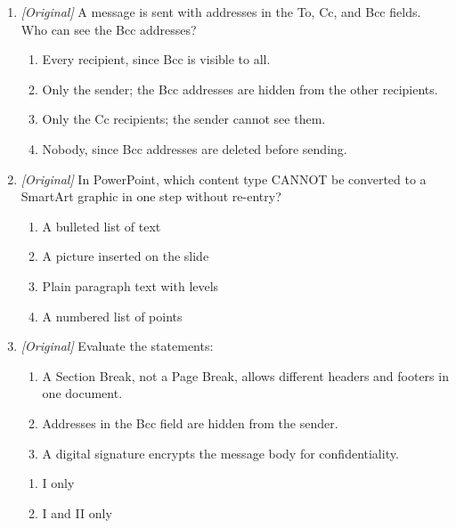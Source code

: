 \begin{enumerate}[label=\textbf{Q\arabic*.}, leftmargin=*]
\begin{enumerate}[label=\Alph*.]
    \item IMAP downloads mail and always deletes it from the server; POP3
      keeps devices synchronised.
    \item SMTP sends mail; POP3 downloads mail to the local device; IMAP keeps
      mail on the server and synchronises devices.
    \item POP3 keeps mail synced on the server across all devices.
  \end{enumerate}
\item \textit{[Original]} A message is sent with addresses in the To, Cc, and
  Bcc fields. Who can see the Bcc addresses?
  \begin{enumerate}[label=\Alph*.]
    \item Every recipient, since Bcc is visible to all.
    \item Only the sender; the Bcc addresses are hidden from the other
      recipients.
    \item Only the Cc recipients; the sender cannot see them.
    \item Nobody, since Bcc addresses are deleted before sending.
  \end{enumerate}
\item \textit{[Original]} In PowerPoint, which content type CANNOT be converted
  to a SmartArt graphic in one step without re-entry?
  \begin{enumerate}[label=\Alph*.]
    \item A bulleted list of text
    \item A picture inserted on the slide
    \item Plain paragraph text with levels
    \item A numbered list of points
  \end{enumerate}
\item \textit{[Original]} Evaluate the statements:
  \begin{enumerate}[label=\Roman*.]
    \item A Section Break, not a Page Break, allows different headers and
      footers in one document.
    \item Addresses in the Bcc field are hidden from the sender.
    \item A digital signature encrypts the message body for confidentiality.
  \end{enumerate}
  \begin{enumerate}[label=\Alph*.]
    \item I only
    \item I and II only

\end{enumerate}
\end{enumerate}
